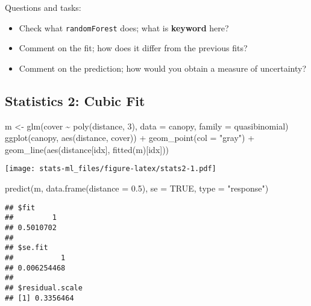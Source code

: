 \documentclass[
]{article}
\newenvironment{Shaded}{\begin{snugshade}}{\end{snugshade}}
\newcommand{\AttributeTok}[1]{\textcolor[rgb]{0.77,0.63,0.00}{#1}}
\newcommand{\ConstantTok}[1]{\textcolor[rgb]{0.00,0.00,0.00}{#1}}
\newcommand{\DecValTok}[1]{\textcolor[rgb]{0.00,0.00,0.81}{#1}}
\newcommand{\FloatTok}[1]{\textcolor[rgb]{0.00,0.00,0.81}{#1}}
\newcommand{\FunctionTok}[1]{\textcolor[rgb]{0.00,0.00,0.00}{#1}}
\newcommand{\NormalTok}[1]{#1}
\newcommand{\OtherTok}[1]{\textcolor[rgb]{0.56,0.35,0.01}{#1}}
\newcommand{\SpecialCharTok}[1]{\textcolor[rgb]{0.00,0.00,0.00}{#1}}
\newcommand{\StringTok}[1]{\textcolor[rgb]{0.31,0.60,0.02}{#1}}
\providecommand{\tightlist}{%
  \setlength{\itemsep}{0pt}\setlength{\parskip}{0pt}}
\begin{document}
Questions and tasks:

\begin{itemize}
\tightlist
\item
  Check what \texttt{randomForest} does; what is \textbf{keyword} here?
\item
  Comment on the fit; how does it differ from the previous fits?
\item
  Comment on the prediction; how would you obtain a measure of
  uncertainty?
\end{itemize}

\hypertarget{statistics-2-cubic-fit}{%
\subsection{Statistics 2: Cubic Fit}\label{statistics-2-cubic-fit}}

\begin{Shaded}
\begin{Highlighting}[]
\NormalTok{m }\OtherTok{\textless{}{-}} \FunctionTok{glm}\NormalTok{(cover }\SpecialCharTok{\textasciitilde{}} \FunctionTok{poly}\NormalTok{(distance, }\DecValTok{3}\NormalTok{), }\AttributeTok{data =}\NormalTok{ canopy, }\AttributeTok{family =}\NormalTok{ quasibinomial)}
\FunctionTok{ggplot}\NormalTok{(canopy, }\FunctionTok{aes}\NormalTok{(distance, cover)) }\SpecialCharTok{+} \FunctionTok{geom\_point}\NormalTok{(}\AttributeTok{col =} \StringTok{"gray"}\NormalTok{) }\SpecialCharTok{+}
  \FunctionTok{geom\_line}\NormalTok{(}\FunctionTok{aes}\NormalTok{(distance[idx], }\FunctionTok{fitted}\NormalTok{(m)[idx]))}
\end{Highlighting}
\end{Shaded}

\texttt{[image: stats-ml\_files/figure-latex/stats2-1.pdf]}

\begin{Shaded}
\begin{Highlighting}[]
\FunctionTok{predict}\NormalTok{(m, }\FunctionTok{data.frame}\NormalTok{(}\AttributeTok{distance =} \FloatTok{0.5}\NormalTok{), }\AttributeTok{se =} \ConstantTok{TRUE}\NormalTok{, }\AttributeTok{type =} \StringTok{"response"}\NormalTok{)}
\end{Highlighting}
\end{Shaded}

\begin{verbatim}
## $fit
##         1 
## 0.5010702 
## 
## $se.fit
##           1 
## 0.006254468 
## 
## $residual.scale
## [1] 0.3356464
\end{verbatim}
\end{document}
